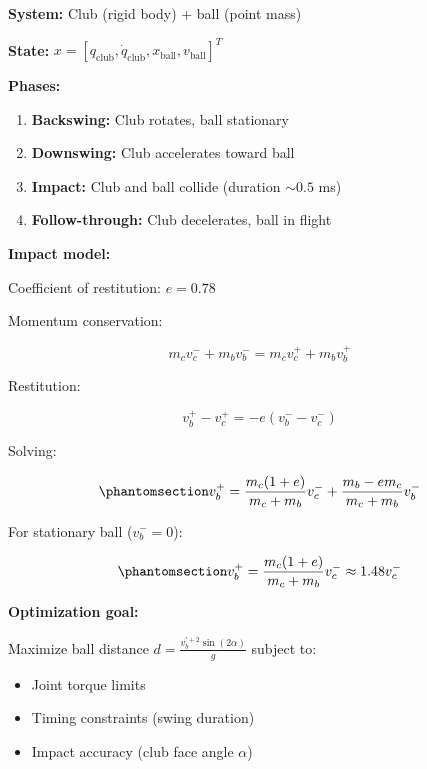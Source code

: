 \documentclass[
  letterpaper,
  DIV=11,
  numbers=noendperiod]{scrartcl}
\providecommand{\tightlist}{%
  \setlength{\itemsep}{0pt}\setlength{\parskip}{0pt}}\usepackage{longtable,booktabs,array}
\begin{document}
\textbf{System:} Club (rigid body) + ball (point mass)

\textbf{State:}
\(x = [q_{\text{club}}, \dot{q}_{\text{club}}, x_{\text{ball}}, v_{\text{ball}}]^T\)

\textbf{Phases:}

\begin{enumerate}
\def\labelenumi{\arabic{enumi}.}
\tightlist
\item
  \textbf{Backswing:} Club rotates, ball stationary
\item
  \textbf{Downswing:} Club accelerates toward ball
\item
  \textbf{Impact:} Club and ball collide (duration \(\sim 0.5\) ms)
\item
  \textbf{Follow-through:} Club decelerates, ball in flight
\end{enumerate}

\textbf{Impact model:}

Coefficient of restitution: \(e = 0.78\)

Momentum conservation:

\[
m_c v_c^- + m_b v_b^- = m_c v_c^+ + m_b v_b^+
\]

Restitution:

\[
v_b^+ - v_c^+ = -e(v_b^- - v_c^-)
\]

Solving:

\begin{equation}\phantomsection\label{eq-golf-impact}{
v_b^+ = \frac{m_c(1 + e)}{m_c + m_b} v_c^- + \frac{m_b - e m_c}{m_c + m_b} v_b^-
}\end{equation}

For stationary ball (\(v_b^- = 0\)):

\begin{equation}\phantomsection\label{eq-golf-ball-velocity}{
v_b^+ = \frac{m_c(1 + e)}{m_c + m_b} v_c^- \approx 1.48 v_c^-
}\end{equation}

\textbf{Optimization goal:}

Maximize ball distance \(d = \frac{v_b^{'+2} \sin(2\alpha)}{g}\) subject
to:

\begin{itemize}
\tightlist
\item
  Joint torque limits
\item
  Timing constraints (swing duration)
\item
  Impact accuracy (club face angle \(\alpha\))
\end{itemize}
\end{document}
